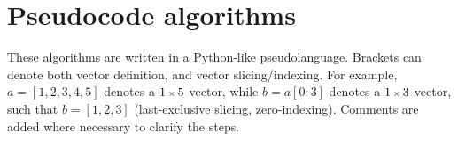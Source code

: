 \section{Pseudocode algorithms}
\label{app:algorithms}
%
These algorithms are written in a Python-like pseudolanguage. Brackets can denote both vector definition, and vector slicing/indexing. For example, $a = [1, 2, 3, 4, 5]$ denotes a $\sz{1}{5}$ vector, while $b = a[0:3]$ denotes a $\sz{1}{3}$ vector, such that $b = [1, 2, 3]$ (last-exclusive slicing, zero-indexing). Comments are added where necessary to clarify the steps.



